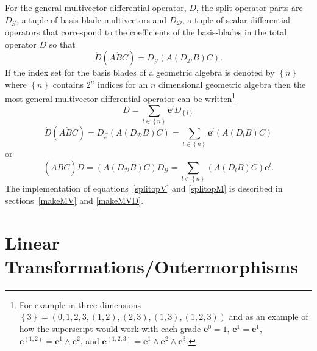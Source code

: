 \documentclass[12pt]{report}
\newcommand{\bm}[1]{\boldsymbol{#1}}
\newcommand{\bra}[1]{{#1}_{\mathcal{G}}}
\newcommand{\ket}[1]{{#1}_{\mathcal{D}}}
\newcommand{\ds}{\displaystyle}
\newcommand{\lp}{\left (}
\newcommand{\rp}{\right )}
\newcommand{\lbrc}{\left \{}
\newcommand{\rbrc}{\right \}}
\newcommand{\set}[1]{\lbrc {#1} \rbrc}
\newcommand{\W}{\wedge}
\newcommand{\paren}[1]{\lp {#1} \rp}
\newcommand{\eb}{\bm{e}}
\begin{document}
For the general multivector differential operator, $D$, the split operator parts are $\bra{D}$, a tuple of basis blade multivectors and $\ket{D}$, a 
tuple of scalar differential operators that correspond to the coefficients of the basis-blades in the total operator $D$ so that
\begin{equation}
	\dot{D}\paren{A\dot{B}C} = \bra{D}\paren{A\paren{\ket{D}B}C}. \label{splitopM}
\end{equation}
If the index set for the basis blades of a geometric algebra is denoted by $\set{n}$ where $\set{n}$ contains $2^{n}$ indices for an $n$ dimensional 
geometric algebra then the most general multivector differential operator can be written\footnote{For example in three dimensions 
$\set{3} = (0,1,2,3,(1,2),(2,3),(1,3),(1,2,3))$ and as an example of how the superscript would work with each grade $\eb^{0}=1$, $\eb^{1}=\eb^{1}$, $\eb^{\paren{1,2}}=\eb^{1}\W\eb^{2}$, and $\eb^{\paren{1,2,3}}=\eb^{1}\W\eb^{2}\W\eb^{3}$.}
\begin{equation}
	D = {\ds \sum_{l\in\set{n}}\eb^{l}D_{\set{l}}}
\end{equation}
\begin{equation}
	\dot{D}\paren{A\dot{B}C} = \bra{D}\paren{A\paren{\ket{D}B}C} = {\ds \sum_{l\in\set{n}}\eb^{l}\paren{A\paren{D_{l}B}C}}
\end{equation}
or
\begin{equation}
	\paren{A\dot{B}C}\dot{D} = \paren{A\paren{\ket{D}B}C}\bra{D} = {\ds \sum_{l\in\set{n}}\paren{A\paren{D_{l}B}C}\eb^{l}}.
\end{equation}
The implementation of equations~\ref{splitopV} and \ref{splitopM} is described in sections~\ref{makeMV} and \ref{makeMVD}.


\section{Linear Transformations/Outermorphisms}\label{Ltrans}
\end{document}

